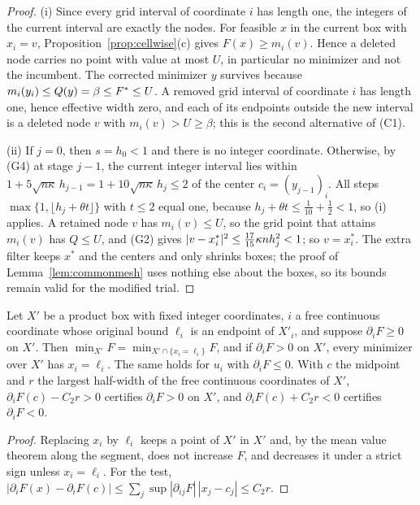\begin{proof}
(i) Since every grid interval of coordinate $i$ has length one, the integers
of the current interval are exactly the nodes. For feasible $x$ in the current
box with $x_i=v$, Proposition~\ref{prop:cellwise}(c) gives $F(x)\ge m_i(v)$.
Hence a deleted node
carries no point with value at most $U$, in particular no minimizer and not
the incumbent. The corrected minimizer $y$ survives because
$m_i(y_i)\le Q(y)=\beta\le F^{*}\le U$. A removed grid interval of
coordinate $i$ has length one, hence effective width zero, and each of its
endpoints outside the new interval is a deleted node $v$ with
$m_i(v)>U\ge\beta$; this is the second alternative of (C1).

(ii) If $j=0$, then $s=h_0<1$ and there is no integer coordinate. Otherwise,
by (G4) at stage $j-1$, the current integer interval lies within
$1+5\sqrt{n\kappa}\,h_{j-1}=1+10\sqrt{n\kappa}\,h_j\le2$ of the center
$c_i=(y_{j-1})_i$. All steps $\max\{1,\lfloor h_j+\theta t\rfloor\}$ with
$t\le2$ equal one, because $h_j+\theta t\le\frac1{10}+\frac12<1$, so (i)
applies. A retained node $v$ has $m_i(v)\le U$, so the grid point that attains
$m_i(v)$ has $Q\le U$, and (G2) gives
$\lvert v-x^*_i\rvert^2\le\frac{17}{15}\kappa nh_j^2<1$; so $v=x^*_i$. The extra
filter keeps $x^*$ and the centers and only shrinks boxes; the proof of
Lemma~\ref{lem:commonmesh} uses nothing else about the boxes, so its bounds
remain valid for the modified trial.
\end{proof}

\begin{lemma}\label{lem:monotone}
Let $X'$ be a product box with fixed integer coordinates, $i$ a free
continuous coordinate whose original bound $\ell_i$ is an endpoint of $X'_i$,
and suppose $\partial_iF\ge0$ on $X'$. Then
$\min_{X'}F=\min_{X'\cap\{x_i=\ell_i\}}F$, and if $\partial_iF>0$ on $X'$,
every minimizer over $X'$ has $x_i=\ell_i$. The same holds for $u_i$ with
$\partial_iF\le0$. With $c$ the midpoint and $r$ the largest half-width of the
free continuous coordinates of $X'$, $\partial_iF(c)-C_2r>0$ certifies
$\partial_iF>0$ on $X'$, and $\partial_iF(c)+C_2r<0$ certifies
$\partial_iF<0$.
\end{lemma}

\begin{proof}
Replacing $x_i$ by $\ell_i$ keeps a point of $X'$ in $X'$ and, by the mean
value theorem along the segment, does not increase $F$, and decreases it under
a strict sign unless $x_i=\ell_i$. For the test,
$|\partial_iF(x)-\partial_iF(c)|\le\sum_j\sup|\partial_{ij}F|\,|x_j-c_j|\le C_2r$.
\end{proof}

